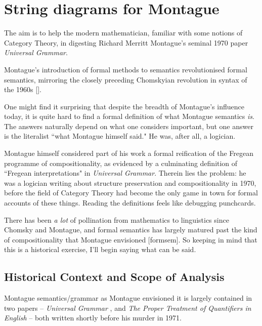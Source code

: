 \section{String diagrams for Montague}\label{sec:monty}

 The aim is to help the modern mathematician, familiar with some notions of Category Theory, in digesting Richard Merritt Montague's seminal 1970 paper \emph{Universal Grammar}.

 Montague's introduction of formal methods to semantics revolutionised formal semantics, mirroring the closely preceding Chomskyian revolution in syntax of the 1960s [].

 One might find it surprising that despite the breadth of Montague's influence today, it is quite hard to find a formal definition of what Montague semantics \emph{is}. The answers naturally depend on what one considers important, but one answer is the literalist ``what Montague himself said." He was, after all, a logician.


Montague himself considered part of his work a formal reification of the Fregean programme of compositionality, as evidenced by a culminating definition of ``Fregean interpretations" in \emph{Universal Grammar}. Therein lies the problem: he was a logician writing about structure preservation and compositionality in 1970, before the field of Category Theory had become the only game in town for formal accounts of these things. Reading the definitions feels like debugging punchcards.


There has been \emph{a lot} of pollination from mathematics to linguistics since Chomsky and Montague, and formal semantics has largely matured past the kind of compositionality that Montague envisioned [formsem]. So keeping in mind that this is a historical exercise, I'll begin saying what can be said.

\subsection{Historical Context and Scope of Analysis}

Montague semantics/grammar as Montague envisioned it is largely contained in two papers -- \emph{Universal Grammar} \cite{montague1970universal}, and \emph{The Proper Treatment of Quantifiers in English} \cite{montague1973proper} -- both written shortly before his murder in 1971.

